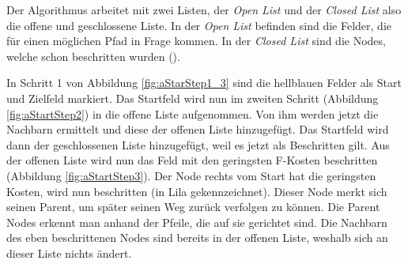 Der Algorithmus arbeitet mit zwei Listen, der \textit{Open List} und der \textit{Closed List} also die offene und geschlossene Liste. In der \textit{Open List} befinden sind die Felder, die für einen möglichen Pfad in Frage kommen. In der \textit{Closed List} sind die Nodes, welche schon beschritten wurden (\cite{astar_intro}).

In Schritt 1 von Abbildung \ref{fig:aStarStep1_3} sind die hellblauen Felder als Start und Zielfeld markiert. Das Startfeld wird nun im zweiten Schritt (Abbildung \ref{fig:aStartStep2}) in die offene Liste aufgenommen. Von ihm werden jetzt die Nachbarn ermittelt und diese der offenen Liste hinzugefügt. Das Startfeld wird dann der geschlossenen Liste hinzugefügt, weil es jetzt als Beschritten gilt. Aus der offenen Liste wird nun das Feld mit den geringsten F-Kosten beschritten (Abbildung \ref{fig:aStartStep3}). Der Node rechts vom Start hat die geringsten Kosten, wird nun beschritten (in Lila gekennzeichnet). Dieser Node merkt sich seinen Parent, um später seinen Weg zurück verfolgen zu können. Die Parent Nodes erkennt man anhand der Pfeile, die auf sie gerichtet sind. Die Nachbarn des eben beschrittenen Nodes sind bereits in der offenen Liste, weshalb sich an dieser Liste nichts ändert.


